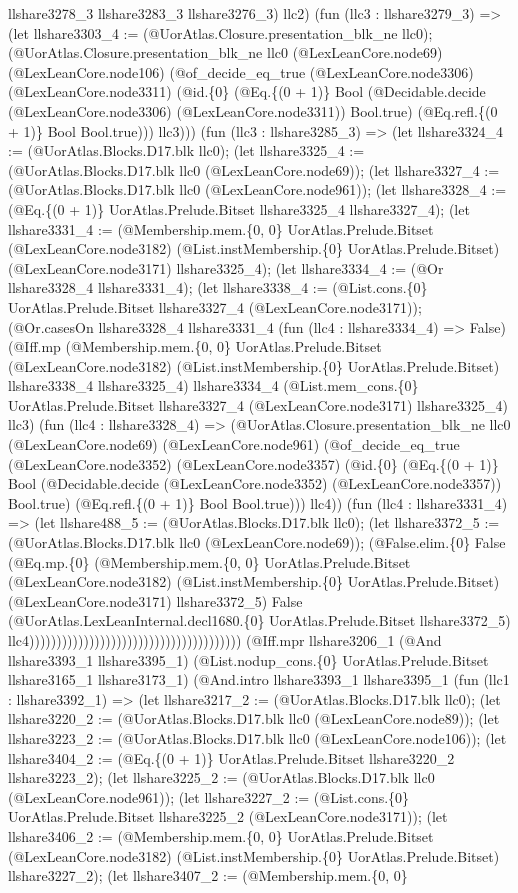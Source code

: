 \documentclass[11pt]{article}
\begin{document}
llshare3278\_3 llshare3283\_3 llshare3276\_3) llc2) (fun (llc3 : llshare3279\_3) => (let llshare3303\_4 := (@UorAtlas.Closure.presentation\_blk\_ne llc0); (@UorAtlas.Closure.presentation\_blk\_ne llc0 (@LexLeanCore.node69) (@LexLeanCore.node106) (@of\_decide\_eq\_true (@LexLeanCore.node3306) (@LexLeanCore.node3311) (@id.\{0\} (@Eq.\{(0 + 1)\} Bool (@Decidable.decide (@LexLeanCore.node3306) (@LexLeanCore.node3311)) Bool.true) (@Eq.refl.\{(0 + 1)\} Bool Bool.true))) llc3))) (fun (llc3 : llshare3285\_3) => (let llshare3324\_4 := (@UorAtlas.Blocks.D17.blk llc0); (let llshare3325\_4 := (@UorAtlas.Blocks.D17.blk llc0 (@LexLeanCore.node69)); (let llshare3327\_4 := (@UorAtlas.Blocks.D17.blk llc0 (@LexLeanCore.node961)); (let llshare3328\_4 := (@Eq.\{(0 + 1)\} UorAtlas.Prelude.Bitset llshare3325\_4 llshare3327\_4); (let llshare3331\_4 := (@Membership.mem.\{0, 0\} UorAtlas.Prelude.Bitset (@LexLeanCore.node3182) (@List.instMembership.\{0\} UorAtlas.Prelude.Bitset) (@LexLeanCore.node3171) llshare3325\_4); (let llshare3334\_4 := (@Or llshare3328\_4 llshare3331\_4); (let llshare3338\_4 := (@List.cons.\{0\} UorAtlas.Prelude.Bitset llshare3327\_4 (@LexLeanCore.node3171)); (@Or.casesOn llshare3328\_4 llshare3331\_4 (fun (llc4 : llshare3334\_4) => False) (@Iff.mp (@Membership.mem.\{0, 0\} UorAtlas.Prelude.Bitset (@LexLeanCore.node3182) (@List.instMembership.\{0\} UorAtlas.Prelude.Bitset) llshare3338\_4 llshare3325\_4) llshare3334\_4 (@List.mem\_cons.\{0\} UorAtlas.Prelude.Bitset llshare3327\_4 (@LexLeanCore.node3171) llshare3325\_4) llc3) (fun (llc4 : llshare3328\_4) => (@UorAtlas.Closure.presentation\_blk\_ne llc0 (@LexLeanCore.node69) (@LexLeanCore.node961) (@of\_decide\_eq\_true (@LexLeanCore.node3352) (@LexLeanCore.node3357) (@id.\{0\} (@Eq.\{(0 + 1)\} Bool (@Decidable.decide (@LexLeanCore.node3352) (@LexLeanCore.node3357)) Bool.true) (@Eq.refl.\{(0 + 1)\} Bool Bool.true))) llc4)) (fun (llc4 : llshare3331\_4) => (let llshare488\_5 := (@UorAtlas.Blocks.D17.blk llc0); (let llshare3372\_5 := (@UorAtlas.Blocks.D17.blk llc0 (@LexLeanCore.node69)); (@False.elim.\{0\} False (@Eq.mp.\{0\} (@Membership.mem.\{0, 0\} UorAtlas.Prelude.Bitset (@LexLeanCore.node3182) (@List.instMembership.\{0\} UorAtlas.Prelude.Bitset) (@LexLeanCore.node3171) llshare3372\_5) False (@UorAtlas.LexLeanInternal.decl1680.\{0\} UorAtlas.Prelude.Bitset llshare3372\_5) llc4))))))))))))))))))))))))))))))))))))))) (@Iff.mpr llshare3206\_1 (@And llshare3393\_1 llshare3395\_1) (@List.nodup\_cons.\{0\} UorAtlas.Prelude.Bitset llshare3165\_1 llshare3173\_1) (@And.intro llshare3393\_1 llshare3395\_1 (fun (llc1 : llshare3392\_1) => (let llshare3217\_2 := (@UorAtlas.Blocks.D17.blk llc0); (let llshare3220\_2 := (@UorAtlas.Blocks.D17.blk llc0 (@LexLeanCore.node89)); (let llshare3223\_2 := (@UorAtlas.Blocks.D17.blk llc0 (@LexLeanCore.node106)); (let llshare3404\_2 := (@Eq.\{(0 + 1)\} UorAtlas.Prelude.Bitset llshare3220\_2 llshare3223\_2); (let llshare3225\_2 := (@UorAtlas.Blocks.D17.blk llc0 (@LexLeanCore.node961)); (let llshare3227\_2 := (@List.cons.\{0\} UorAtlas.Prelude.Bitset llshare3225\_2 (@LexLeanCore.node3171)); (let llshare3406\_2 := (@Membership.mem.\{0, 0\} UorAtlas.Prelude.Bitset (@LexLeanCore.node3182) (@List.instMembership.\{0\} UorAtlas.Prelude.Bitset) llshare3227\_2); (let llshare3407\_2 := (@Membership.mem.\{0, 0\} 
\end{document}
